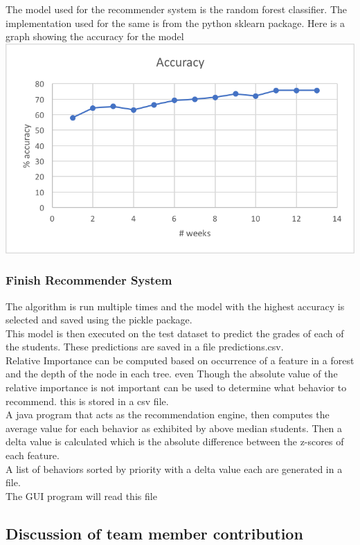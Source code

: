 \documentclass[12pt]{article}
\begin{document}
	The model used for the recommender system is the random forest classifier. The implementation used for the same is from the python sklearn package. Here is a graph showing the accuracy for the model\\
	\includegraphics{1.png}
		\subsubsection{Finish Recommender System}
	The algorithm is run multiple times and the model with the highest accuracy is selected and saved using the pickle package. \\
	This model is then executed on the test dataset to predict the grades of each of the students. These predictions are saved in a file predictions.csv. \\
	Relative Importance can be computed based on occurrence of a feature in a forest and the depth of the node in each tree. even Though the absolute value of the relative importance is not important can be used to determine what behavior to recommend. this is stored in a csv file.\\
	A java program that acts as the recommendation engine, then computes the average value for each behavior as exhibited by above median students. Then a delta value is calculated which is the absolute difference between the z-scores of each feature. \\
	A list of behaviors sorted by priority with a delta value each are generated in a file. \\
	The GUI program will read this file 

	\subsection{Discussion of team member contribution}
\end{document}
